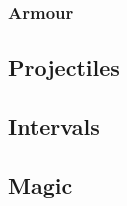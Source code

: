\documentclass[a4paper,openany]{book}
\begin{document}
\begin{multicols}{2}
\subsubsection*{Armour}



\commonArmourChart

\mentalSkillChart

\subsection*{Projectiles}



\subsection*{Intervals}



\subsection*{Magic}



\end{multicols}
\end{document}
